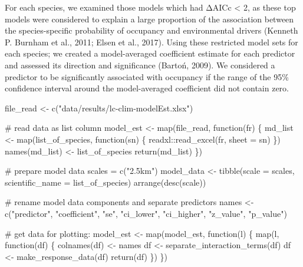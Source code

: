 \documentclass[]{article}
\newenvironment{Shaded}{}{}
\newcommand{\CommentTok}[1]{\textcolor[rgb]{0.00,0.50,0.00}{#1}}
\newcommand{\ControlFlowTok}[1]{\textcolor[rgb]{0.00,0.00,1.00}{#1}}
\newcommand{\DataTypeTok}[1]{#1}
\newcommand{\KeywordTok}[1]{\textcolor[rgb]{0.00,0.00,1.00}{#1}}
\newcommand{\NormalTok}[1]{#1}
\newcommand{\OperatorTok}[1]{#1}
\newcommand{\StringTok}[1]{\textcolor[rgb]{0.00,0.50,0.50}{#1}}
\begin{document}
For each species, we examined those models which had ΔAICc \textless{} 2, as these top models were considered to explain a large proportion of the association between the species-specific probability of occupancy and environmental drivers (Kenneth P. Burnham et al., 2011; Elsen et al., 2017). Using these restricted model sets for each species; we created a model-averaged coefficient estimate for each predictor and assessed its direction and significance (Bartoń, 2009). We considered a predictor to be significantly associated with occupancy if the range of the 95\% confidence interval around the model-averaged coefficient did not contain zero.

\begin{Shaded}
\begin{Highlighting}[numbers=left,,]
\NormalTok{file_read <-}\StringTok{ }\KeywordTok{c}\NormalTok{(}\StringTok{"data/results/lc-clim-modelEst.xlsx"}\NormalTok{)}

\CommentTok{# read data as list column}
\NormalTok{model_est <-}\StringTok{ }\KeywordTok{map}\NormalTok{(file_read, }\ControlFlowTok{function}\NormalTok{(fr) \{}
\NormalTok{  md_list <-}\StringTok{ }\KeywordTok{map}\NormalTok{(list_of_species, }\ControlFlowTok{function}\NormalTok{(sn) \{}
\NormalTok{    readxl}\OperatorTok{::}\KeywordTok{read_excel}\NormalTok{(fr, }\DataTypeTok{sheet =}\NormalTok{ sn)}
\NormalTok{  \})}
  \KeywordTok{names}\NormalTok{(md_list) <-}\StringTok{ }\NormalTok{list_of_species}
  \KeywordTok{return}\NormalTok{(md_list)}
\NormalTok{\})}

\CommentTok{# prepare model data}
\NormalTok{scales =}\StringTok{ }\KeywordTok{c}\NormalTok{(}\StringTok{"2.5km"}\NormalTok{)}
\NormalTok{model_data <-}\StringTok{ }\KeywordTok{tibble}\NormalTok{(}\DataTypeTok{scale =}\NormalTok{ scales, }
                              \DataTypeTok{scientific_name =}\NormalTok{ list_of_species) }\OperatorTok{%
\StringTok{  }\KeywordTok{arrange}\NormalTok{(}\KeywordTok{desc}\NormalTok{(scale))}

\CommentTok{# rename model data components and separate predictors}
\NormalTok{names <-}\StringTok{ }\KeywordTok{c}\NormalTok{(}\StringTok{"predictor"}\NormalTok{, }\StringTok{"coefficient"}\NormalTok{, }\StringTok{"se"}\NormalTok{, }\StringTok{"ci_lower"}\NormalTok{, }
           \StringTok{"ci_higher"}\NormalTok{, }\StringTok{"z_value"}\NormalTok{, }\StringTok{"p_value"}\NormalTok{)}

\CommentTok{# get data for plotting:}
\NormalTok{model_est <-}\StringTok{ }\KeywordTok{map}\NormalTok{(model_est, }\ControlFlowTok{function}\NormalTok{(l) \{}
  \KeywordTok{map}\NormalTok{(l, }\ControlFlowTok{function}\NormalTok{(df) \{}
    \KeywordTok{colnames}\NormalTok{(df) <-}\StringTok{ }\NormalTok{names}
\NormalTok{    df <-}\StringTok{ }\KeywordTok{separate_interaction_terms}\NormalTok{(df)}
\NormalTok{    df <-}\StringTok{ }\KeywordTok{make_response_data}\NormalTok{(df) }
    \KeywordTok{return}\NormalTok{(df)}
\NormalTok{  \})}
\NormalTok{\})}

}
\end{Highlighting}
\end{Shaded}
\end{document}
